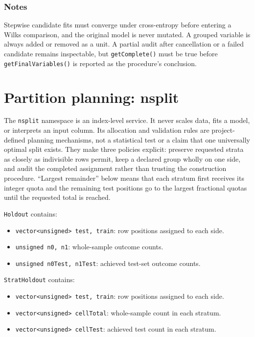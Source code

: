 \subsubsection{Notes}
Stepwise candidate fits must converge under cross-entropy before entering a
Wilks comparison, and the original model is never mutated.  A grouped variable
is always added or removed as a unit.  A partial audit after cancellation or a
failed candidate remains inspectable, but \texttt{getComplete()} must be true
before \texttt{getFinalVariables()} is reported as the procedure's conclusion.

\section{Partition planning: nsplit}\label{nsplit_objects}

The \texttt{nsplit} namespace is an index-level service.  It never scales data,
fits a model, or interprets an input column.  Its allocation and validation
rules are project-defined planning mechanisms, not a statistical test or a
claim that one universally optimal split exists.  They make three policies
explicit: preserve requested strata as closely as indivisible rows permit,
keep a declared group wholly on one side, and audit the completed assignment
rather than trusting the construction procedure.  ``Largest remainder'' below
means that each stratum first receives its integer quota and the remaining test
positions go to the largest fractional quotas until the requested total is
reached.

\texttt{Holdout} contains:

\begin{itemize}
\item \texttt{vector<unsigned> test, train}: row positions assigned to each
      side.
\item \texttt{unsigned n0, n1}: whole-sample outcome counts.
\item \texttt{unsigned n0Test, n1Test}: achieved test-set outcome counts.
\end{itemize}

\texttt{StratHoldout} contains:

\begin{itemize}
\item \texttt{vector<unsigned> test, train}: row positions assigned to each
      side.
\item \texttt{vector<unsigned> cellTotal}: whole-sample count in each stratum.
\item \texttt{vector<unsigned> cellTest}: achieved test count in each stratum.
\end{itemize}

